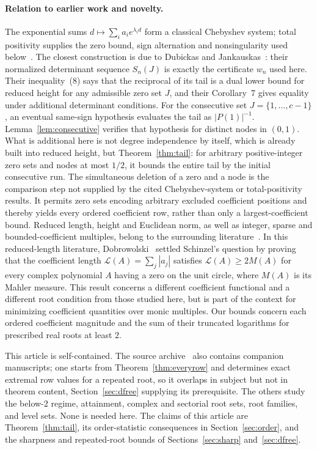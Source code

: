 \documentclass[11pt]{article}
\begin{document}
\paragraph{Relation to earlier work and novelty.}
The exponential sums $d\mapsto\sum_i a_i e^{\lambda_i d}$ form a classical
Chebyshev system; total positivity supplies the zero bound, sign alternation
and nonsingularity used below~\cite{karlin,karlin-studden,pinkus}.  The
closest construction is due to Dubickas and Jankauskas~\cite{dj}: their
normalized determinant sequence $S_n(J)$ is exactly the certificate $w_n$
used here.  Their inequality~(8) says that the reciprocal of its tail is a
dual lower bound for reduced height for any admissible zero set $J$, and
their Corollary~7 gives equality under additional determinant conditions.
For the consecutive set $J=\{1,\ldots,c-1\}$, an eventual same-sign
hypothesis evaluates the tail as $|P(1)|^{-1}$.
Lemma~\ref{lem:consecutive} verifies that hypothesis for distinct nodes in
$(0,1)$.  What is additional here is not degree independence by itself, which
is already built into reduced height, but Theorem~\ref{thm:tail}: for
arbitrary positive-integer zero sets and nodes at most $1/2$, it bounds the
entire tail by the initial consecutive run.  The simultaneous deletion of a
zero and a node is the comparison step not supplied by the cited
Chebyshev-system or total-positivity results.  It permits zero sets encoding
arbitrary excluded coefficient positions and thereby yields every ordered
coefficient row, rather than only a largest-coefficient bound.
Reduced length, height and Euclidean norm, as well as integer, sparse and
bounded-coefficient multiples, belong to the surrounding literature~\cite{dubickas,schinzel,schinzel-ii,schinzel-complex,frw,mignotte,
bombieri-vaaler,bbbp-multiple,bbbp-ray,grt}.
In this reduced-length literature, Dobrowolski~\cite{dobrowolski} settled
Schinzel's question by proving that the coefficient length
$\mathcal L(A)=\sum_j|a_j|$ satisfies $\mathcal L(A)\ge2M(A)$ for every
complex polynomial $A$ having a zero on the unit circle, where $M(A)$ is
its Mahler measure.  This result concerns a different coefficient
functional and a different root condition from those studied here, but is
part of the context for minimizing coefficient quantities over monic
multiples.  Our bounds concern each ordered coefficient magnitude and the
sum of their truncated logarithms for prescribed real roots at least $2$.

This article is self-contained.  The source archive~\cite{archive} also
contains companion manuscripts; one starts from Theorem~\ref{thm:everyrow} and
determines exact extremal row values for a repeated root, so it overlaps in
subject but not in theorem content, Section~\ref{sec:dfree} supplying its
prerequisite.  The others study the below-$2$ regime, attainment, complex and
sectorial root sets, root families, and level sets.  None is needed here.
The claims of this article are Theorem~\ref{thm:tail}, its order-statistic
consequences in Section~\ref{sec:order}, and the sharpness and repeated-root
bounds of Sections~\ref{sec:sharp} and~\ref{sec:dfree}.
\end{document}
